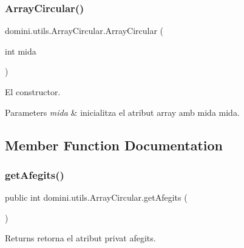 \subsubsection{\texorpdfstring{Array\+Circular()}{ArrayCircular()}}
{\footnotesize\ttfamily domini.\+utils.\+Array\+Circular.\+Array\+Circular (\begin{DoxyParamCaption}\item[{int}]{mida }\end{DoxyParamCaption})\hspace{0.3cm}{\ttfamily [inline]}}



El constructor. 


\begin{DoxyParams}{Parameters}
{\em mida} & inicialitza el atribut array amb mida mida. \\
\hline
\end{DoxyParams}


\subsection{Member Function Documentation}
\mbox{\label{classdomini_1_1utils_1_1ArrayCircular_a1c65dd3b452fa82ab8827885a7a2fbe1}} 
\subsubsection{\texorpdfstring{get\+Afegits()}{getAfegits()}}
{\footnotesize\ttfamily public int domini.\+utils.\+Array\+Circular.\+get\+Afegits (\begin{DoxyParamCaption}{ }\end{DoxyParamCaption})\hspace{0.3cm}{\ttfamily [inline]}}

\begin{DoxyReturn}{Returns}
retorna el atribut privat afegits. 
\end{DoxyReturn}
\mbox{\label{classdomini_1_1utils_1_1ArrayCircular_a3fe38ed7aa9d3b4f99bc4c80cd72bb3e}} 
